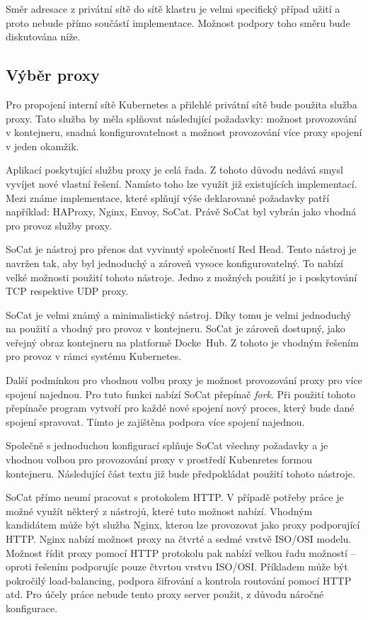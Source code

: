 Směr adresace z privátní sítě do sítě klastru je velmi specifický případ užití a proto nebude přímo součástí implementace. Možnost podpory toho směru bude diskutována níže.

\subsection{Výběr proxy}
Pro propojení interní sítě Kubernetes a přilehlé privátní sítě bude použita služba proxy. Tato služba by měla splňovat následující požadavky: možnost provozování v kontejneru, snadná konfigurovatelnost a možnost provozování více proxy spojení v jeden okamžik.

Aplikací poskytující službu proxy je celá řada. Z tohoto důvodu nedává smysl vyvíjet nové vlastní řešení. Namísto toho lze využít již existujících implementací. Mezi známe implementace, které splňují výše deklarované požadavky patří například: HAProxy, Nginx, Envoy, SoCat. Právě SoCat byl vybrán jako vhodná pro provoz služby proxy.

SoCat je nástroj pro přenos dat vyvinutý společností Red Head. Tento nástroj je navržen tak, aby byl jednoduchý a zároveň vysoce konfigurovatelný. To nabízí velké možnosti použití tohoto nástroje. Jedno z možných použití je i poskytování TCP respektive UDP proxy. \cite{amoany_2020_getting}

SoCat je velmi známý a minimalistický nástroj. Díky tomu je velmi jednoduchý na použití a vhodný pro provoz v kontejneru. SoCat je zároveň dostupný, jako veřejný obraz kontejneru na platformě Docke~Hub. Z tohoto je vhodným řešením pro provoz v rámci systému Kubernetes.

Další podmínkou pro vhodnou volbu proxy je možnost provozování proxy pro více spojení najednou. Pro tuto funkci nabízí SoCat přepínač \textit{fork}. Při použití tohoto přepínače program vytvoří pro každé nové spojení nový proces, který bude dané spojení spravovat. Tímto je zajištěna podpora více spojení najednou.

Společně s jednoduchou konfigurací splňuje SoCat všechny požadavky a je vhodnou volbou pro provozování proxy v prostředí Kubenretes formou kontejneru. Následující část textu již bude předpokládat použití tohoto nástroje. 

\bigskip

SoCat přímo neumí pracovat s protokolem HTTP. V případě potřeby práce je možné využít některý z nástrojů, které tuto možnost nabízí. Vhodným kandidátem může být služba Nginx, kterou lze provozovat jako proxy podporující HTTP. Nginx nabízí možnost proxy na čtvrté a sedmé vrstvě ISO/OSI modelu. Možnost řídit proxy pomocí HTTP protokolu pak nabízí velkou řadu možností -- oproti řešením podporujíc pouze čtvrtou vrstvu ISO/OSI. Příkladem může být pokročilý load-balancing, podpora šifrování a kontrola routování pomocí HTTP atd. Pro účely práce nebude tento proxy server použit, z důvodu náročné konfigurace.      

